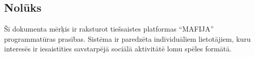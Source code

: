 \subsection*{Nolūks}
Šī dokumenta mērķis ir raksturot tiešsaistes platformas ``MAFIJA'' programmatūras prasības.
Sistēma ir paredzēta individuāliem lietotājiem, kuru interesēs ir iesaistīties savstarpējā sociālā aktivitātē lomu spēles formātā.
